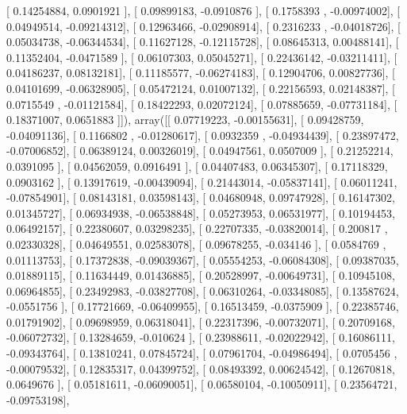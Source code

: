 \documentclass{article}
\begin{document}
       [ 0.14254884,  0.0901921 ],
       [ 0.09899183, -0.0910876 ],
       [ 0.1758393 , -0.00974002],
       [ 0.04949514, -0.09214312],
       [ 0.12963466, -0.02908914],
       [ 0.2316233 , -0.04018726],
       [ 0.05034738, -0.06344534],
       [ 0.11627128, -0.12115728],
       [ 0.08645313,  0.00488141],
       [ 0.11352404, -0.0471589 ],
       [ 0.06107303,  0.05045271],
       [ 0.22436142, -0.03211411],
       [ 0.04186237,  0.08132181],
       [ 0.11185577, -0.06274183],
       [ 0.12904706,  0.00827736],
       [ 0.04101699, -0.06328905],
       [ 0.05472124,  0.01007132],
       [ 0.22156593,  0.02148387],
       [ 0.0715549 , -0.01121584],
       [ 0.18422293,  0.02072124],
       [ 0.07885659, -0.07731184],
       [ 0.18371007,  0.0651883 ]]), array([[ 0.07719223, -0.00155631],
       [ 0.09428759, -0.04091136],
       [ 0.1166802 , -0.01280617],
       [ 0.0932359 , -0.04934439],
       [ 0.23897472, -0.07006852],
       [ 0.06389124,  0.00326019],
       [ 0.04947561,  0.0507009 ],
       [ 0.21252214,  0.0391095 ],
       [ 0.04562059,  0.0916491 ],
       [ 0.04407483,  0.06345307],
       [ 0.17118329,  0.0903162 ],
       [ 0.13917619, -0.00439094],
       [ 0.21443014, -0.05837141],
       [ 0.06011241, -0.07854901],
       [ 0.08143181,  0.03598143],
       [ 0.04680948,  0.09747928],
       [ 0.16147302,  0.01345727],
       [ 0.06934938, -0.06538848],
       [ 0.05273953,  0.06531977],
       [ 0.10194453,  0.06492157],
       [ 0.22380607,  0.03298235],
       [ 0.22707335, -0.03820014],
       [ 0.200817  ,  0.02330328],
       [ 0.04649551,  0.02583078],
       [ 0.09678255, -0.034146  ],
       [ 0.0584769 ,  0.01113753],
       [ 0.17372838, -0.09039367],
       [ 0.05554253, -0.06084308],
       [ 0.09387035,  0.01889115],
       [ 0.11634449,  0.01436885],
       [ 0.20528997, -0.00649731],
       [ 0.10945108,  0.06964855],
       [ 0.23492983, -0.03827708],
       [ 0.06310264, -0.03348085],
       [ 0.13587624, -0.0551756 ],
       [ 0.17721669, -0.06409955],
       [ 0.16513459, -0.0375909 ],
       [ 0.22385746,  0.01791902],
       [ 0.09698959,  0.06318041],
       [ 0.22317396, -0.00732071],
       [ 0.20709168, -0.06072732],
       [ 0.13284659, -0.010624  ],
       [ 0.23988611, -0.02022942],
       [ 0.16086111, -0.09343764],
       [ 0.13810241,  0.07845724],
       [ 0.07961704, -0.04986494],
       [ 0.0705456 , -0.00079532],
       [ 0.12835317,  0.04399752],
       [ 0.08493392,  0.00624542],
       [ 0.12670818,  0.0649676 ],
       [ 0.05181611, -0.06090051],
       [ 0.06580104, -0.10050911],
       [ 0.23564721, -0.09753198],
\end{document}
